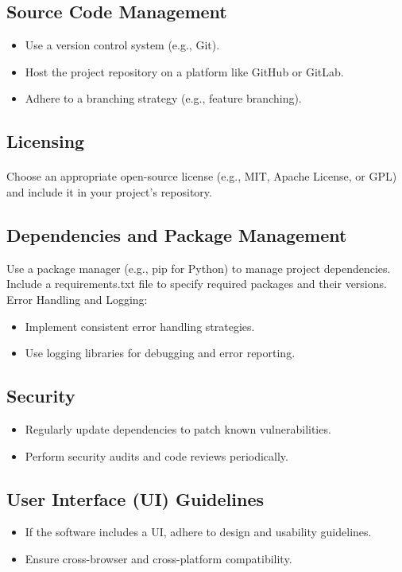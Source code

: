 \documentclass{article}
\begin{document}
\subsection{Source Code Management}
\begin{itemize}
    \item Use a version control system (e.g., Git).
    \item Host the project repository on a platform like GitHub or GitLab.
    \item Adhere to a branching strategy (e.g., feature branching).
\end{itemize}

\subsection{Licensing}
\paragraph{}
Choose an appropriate open-source license (e.g., MIT, Apache License, or GPL) and
include it in your project's repository.

\subsection{Dependencies and Package Management}
Use a package manager (e.g., pip for Python) to manage project dependencies.
Include a requirements.txt file to specify required packages and their versions.
Error Handling and Logging:
\begin{itemize}
    \item Implement consistent error handling strategies.
    \item Use logging libraries for debugging and error reporting.
\end{itemize}

\subsection{Security}
\begin{itemize}
    \item Regularly update dependencies to patch known vulnerabilities.
    \item Perform security audits and code reviews periodically.
\end{itemize}

\subsection{User Interface (UI) Guidelines}
\begin{itemize}
    \item If the software includes a UI, adhere to design and usability guidelines.
    \item Ensure cross-browser and cross-platform compatibility.
\end{itemize}
\end{document}
